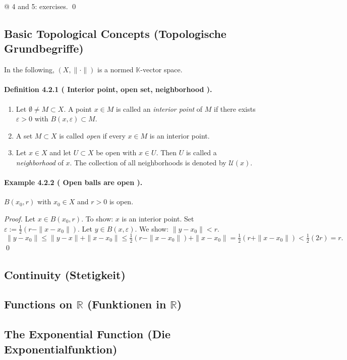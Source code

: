 \documentclass[12pt,a4paper]{article}
\newcommand{\R}{\mathbb{R}}
\newcommand{\K}{\mathbb{K}} %
\newcommand{\eps}{\varepsilon}
\newcommand{\NumberedDefinition}[3]{%
\paragraph*{Definition #1 ( #2 ).} #3\par}
\newcommand{\NumberedExample}[3]{%
\paragraph*{Example #1 ( #2 ).} #3\par}
\theoremstyle{plain}
\theoremstyle{definition}
\theoremstyle{remark}
\begin{document}
@ 4 and 5: exercises. \qed

\subsection{Basic Topological Concepts (Topologische Grundbegriffe)}

In the following, $(X,\|\cdot\|)$ is a normed $\K$-vector space.

\NumberedDefinition{4.2.1}{Interior point, open set, neighborhood}{
\begin{enumerate}[label={(\arabic*)}, leftmargin=*]
	\item Let $\emptyset\ne M\subset X$. A point $x\in M$ is called an \emph{interior point} of $M$ if there exists $\eps>0$ with $B(x,\eps)\subset M$.
	\item A set $M\subset X$ is called \emph{open} if every $x\in M$ is an interior point.
	\item Let $x\in X$ and let $U\subset X$ be open with $x\in U$. Then $U$ is called a \emph{neighborhood} of $x$. The collection of all neighborhoods is denoted by $\mathcal U(x)$.
\end{enumerate}}

\NumberedExample{4.2.2}{Open balls are open}{$B(x_0,r)$ with $x_0\in X$ and $r>0$ is open.

\emph{Proof.} Let $x\in B(x_0,r)$. To show: $x$ is an interior point. Set $\eps := \tfrac{1}{2}(r-\|x-x_0\|)$. Let $y\in B(x,\eps)$. We show: $\|y-x_0\|<r$.
\[
	\ \|y-x_0\| \le \|y-x\| + \|x-x_0\| \le \tfrac{1}{2}(r-\|x-x_0\|) + \|x-x_0\|
		 = \tfrac{1}{2}(r+\|x-x_0\|) < \tfrac{1}{2}(2r) = r.
\]
\qed}
	
\subsection{Continuity (Stetigkeit)}
	
\subsection{Functions on \texorpdfstring{$\R$}{R} (Funktionen in \texorpdfstring{$\R$}{R})}
	
\subsection{The Exponential Function (Die Exponentialfunktion)}
	
\end{document}
